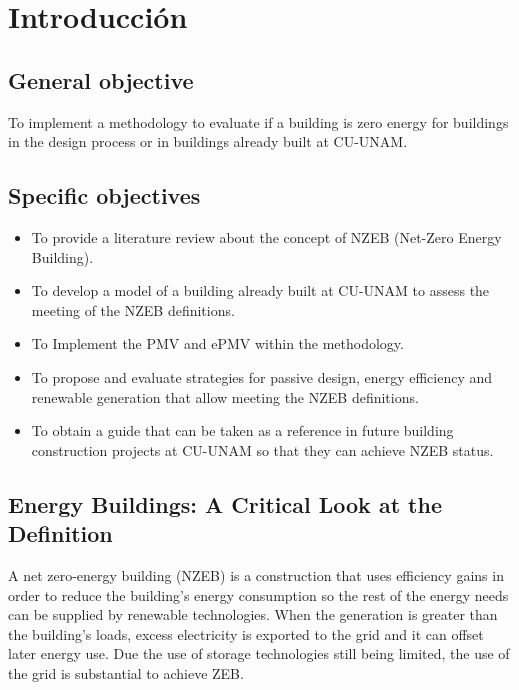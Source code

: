 \chapter{Introducción}
\label{chap:introduccion}

\section{General objective}

To implement a methodology to evaluate if a building is zero energy for buildings in the design process or in buildings already built at CU-UNAM.


\section{Specific objectives}

\begin{itemize}

\item To provide a literature review about the concept of NZEB (Net-Zero Energy Building).

\item To develop a model of a building already built  at CU-UNAM to assess the meeting of the NZEB definitions.

\item To Implement the PMV and ePMV within the methodology.

\item To propose and evaluate strategies for passive design, energy efficiency and renewable generation that allow meeting the NZEB definitions.

\item To obtain a guide that can be taken as a reference in future building construction projects at CU-UNAM so that they can achieve NZEB status.

\end{itemize}


\section{Energy Buildings: A Critical Look at the Definition}

A net zero-energy building (NZEB) is a construction that uses efficiency gains in order to reduce the building's energy consumption so the rest of the energy needs can be supplied by renewable technologies. When the generation is greater than the building's loads, excess electricity is exported to the grid and it can offset later energy use. Due the use of storage technologies still being limited, the use of the grid is substantial to achieve ZEB.


